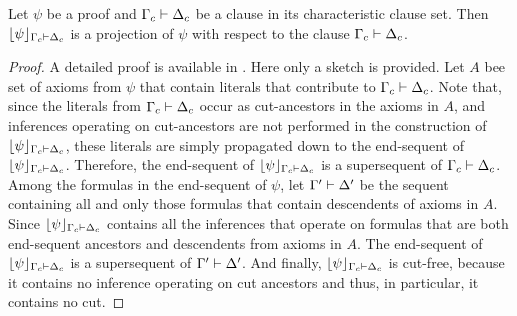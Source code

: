 \documentclass{llncs}
\begin{document}
\begin{theorem}
Let $\psi$ be a proof and $\Gamma_c \vdash \Delta_c$ be a clause in its characteristic clause set. Then $\lfloor \psi \rfloor_{\Gamma_c \vdash \Delta_c}$ is a projection of $\psi$ with respect to the clause $\Gamma_c \vdash \Delta_c$.
\end{theorem}
\begin{proof}
A detailed proof is available in \cite{ToDo}. Here only a sketch is provided. Let $A$ bee set of axioms from $\psi$ that contain literals that contribute to $\Gamma_c \vdash \Delta_c$. Note that, since the literals from $\Gamma_c \vdash \Delta_c$ occur as cut-ancestors in the axioms in $A$, and inferences operating on cut-ancestors are not performed in the construction of $\lfloor \psi \rfloor_{\Gamma_c \vdash \Delta_c}$, these literals are simply propagated down to the end-sequent of $\lfloor \psi \rfloor_{\Gamma_c \vdash \Delta_c}$. Therefore, the end-sequent of $\lfloor \psi \rfloor_{\Gamma_c \vdash \Delta_c}$ is a supersequent of $\Gamma_c \vdash \Delta_c$. Among the formulas in the end-sequent of $\psi$, let $\Gamma' \vdash \Delta'$ be the sequent containing all and only those formulas that contain descendents of axioms in $A$. Since $\lfloor \psi \rfloor_{\Gamma_c \vdash \Delta_c}$ contains all the inferences that operate on formulas that are both end-sequent ancestors and descendents from axioms in $A$. The end-sequent of $\lfloor \psi \rfloor_{\Gamma_c \vdash \Delta_c}$ is a supersequent of $\Gamma' \vdash \Delta'$. And finally, $\lfloor \psi \rfloor_{\Gamma_c \vdash \Delta_c}$ is cut-free, because it contains no inference operating on cut ancestors and thus, in particular, it contains no cut.
\end{proof}
\end{document}
